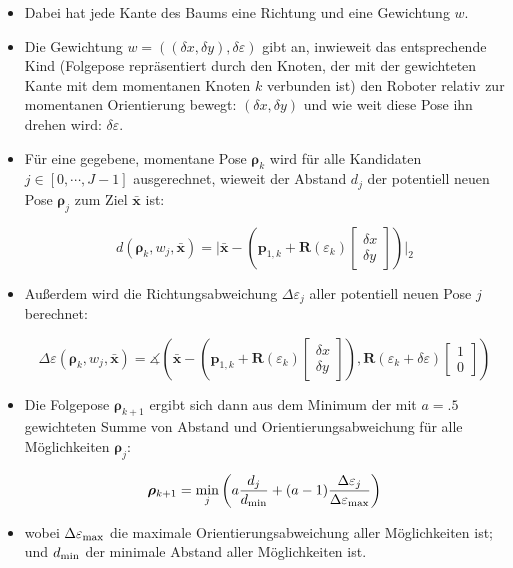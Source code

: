 \documentclass[10pt,a4paper]{article}
\begin{document}
\begin{itemize}
	\item Dabei hat jede Kante des Baums eine Richtung und eine Gewichtung $w$.

	\item Die Gewichtung $w = ((\delta x, \delta y), \delta \varepsilon)$ gibt an, inwieweit das entsprechende Kind (Folgepose repräsentiert durch den Knoten, der mit der gewichteten Kante mit dem momentanen Knoten $k$ verbunden ist) den Roboter relativ zur momentanen Orientierung bewegt: $(\delta x, \delta y)$ und wie weit diese Pose ihn drehen wird: $\delta \varepsilon$.

	\item Für eine gegebene, momentane Pose $\bm{\rho}_k$ wird für alle Kandidaten $j \in [0,\cdots,J-1]$ ausgerechnet, wieweit der Abstand $d_j$ der potentiell neuen Pose $\bm{\rho}_j$ zum Ziel $\bar{\bm{x}}$ ist:

	\begin{equation}
	d(\bm{\rho}_k, w_j, \bar{\bm{x}}) = \bigg| \bar{\bm{x}} - \left(\bm{p}_{1,k} + \bm{R}(\varepsilon_k)\begin{bmatrix}
	\delta x \\ \delta y
\end{bmatrix}	 \right)\bigg|_2
	\end{equation}	
	
	\item Außerdem wird die Richtungsabweichung $\Delta \varepsilon_j$ aller potentiell neuen Pose $j$ berechnet:
	
	\begin{equation}
	\Delta \varepsilon (\bm{\rho}_k, w_j, \bar{\bm{x}}) = \measuredangle\left( \bar{\bm{x}} - \left(\bm{p}_{1,k} + \bm{R}(\varepsilon_k)\begin{bmatrix}
	\delta x \\ \delta y
\end{bmatrix} \right), \bm{R}(\varepsilon_k + \delta \varepsilon) \begin{bmatrix}
1 \\ 0
\end{bmatrix} \right)
	\end{equation}

	\item Die Folgepose $\bm{\rho}_{k+1}$ ergibt sich dann aus dem Minimum der mit $a=.5$ gewichteten Summe von Abstand und Orientierungsabweichung für alle Möglichkeiten $\bm{\rho}_{j}$:
	
	\begin{equation}
	\bm{\rho}_{k+1} = \min_j \left( a \frac{d_j}{d_{\textnormal{min}}}  + (a-1)\frac{\Delta \varepsilon_j}{\Delta \varepsilon_{\textnormal{max}}} \right)
	\end{equation}

	\item wobei $\Delta \varepsilon_{\textnormal{max}}$ die maximale Orientierungsabweichung aller Möglichkeiten ist; und $d_{\textnormal{min}}$ der minimale Abstand aller Möglichkeiten ist.

\end{itemize}
\end{document}
